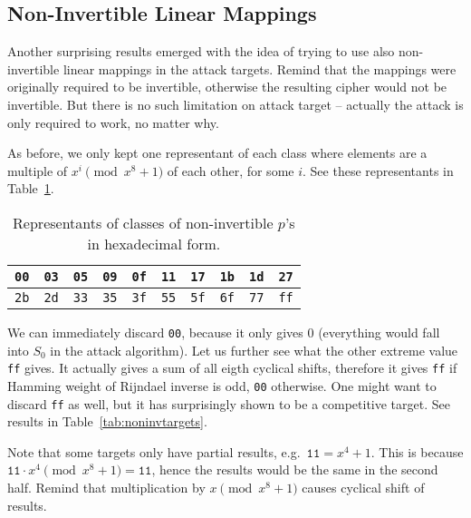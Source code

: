 
\subsection{Non-Invertible Linear Mappings}

Another surprising results emerged with the idea of trying to use also non-invertible linear mappings in the attack targets. Remind that the mappings were originally required to be invertible, otherwise the resulting cipher would not be invertible. But there is no such limitation on attack target -- actually the attack is only required to work, no matter why.

As before, we only kept one representant of each class where elements are a multiple of $x^i\pmod{x^8+1}$ of each other, for some $i$. See these representants in Table~\ref{tab:classreprenoninv}.

\begin{table}[h]
	\begin{center}
	\begin{tabular}{| c | c | c | c | c | c | c | c | c | c |}
		\hline
		{\tt 00} & {\tt 03} & {\tt 05} & {\tt 09} & {\tt 0f} & {\tt 11} & {\tt 17} & {\tt 1b} & {\tt 1d} & {\tt 27} \\
		\hline
		{\tt 2b} & {\tt 2d} & {\tt 33} & {\tt 35} & {\tt 3f} & {\tt 55} & {\tt 5f} & {\tt 6f} & {\tt 77} & {\tt ff} \\
		\hline
	\end{tabular}
	\end{center}
\caption{Representants of classes of non-invertible $p$'s in hexadecimal form.}
\label{tab:classreprenoninv}
\end{table}

We can immediately discard {\tt 00}, because it only gives $0$ (everything would fall into $S_0$ in the attack algorithm). Let us further see what the other extreme value {\tt ff} gives. It actually gives a sum of all eigth cyclical shifts, therefore it gives {\tt ff} if Hamming weight of Rijndael inverse is odd, {\tt 00} otherwise. One might want to discard {\tt ff} as well, but it has surprisingly shown to be a competitive target. See results in Table~\ref{tab:noninvtargets}.

Note that some targets only have partial results, e.g.\ $\texttt{11} = x^4+1$. This is because $\texttt{11}\cdot x^4 \pmod{x^8+1} = \texttt{11}$, hence the results would be the same in the second half. Remind that multiplication by $x\pmod{x^8+1}$ causes cyclical shift of results.

